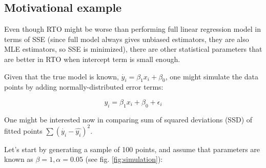 \documentclass[12pt,a4paper,oneside]{book} %
\begin{document}
	\subsection{Motivational example}

Even though RTO might be worse than performing full linear regression model in terms of SSE (since full model always gives unbiased estimators, they are also MLE estimators, so SSE is minimized), there are other statistical parameters that are better in RTO when intercept term is small enough.

Given that the true model is known, $\dot{y_i} = \beta_1 x_i + \beta_0$, one might simulate the data points by adding normally-distributed error terms:

\[
	y_i =  \beta_1 x_i + \beta_0 + \epsilon_i
\]

One might be interested now in comparing sum of squared deviations (SSD) of fitted points $\sum (\dot{y_i}-\hat{y_i})^2 $.

Let's start by generating a sample of 100 points, and assume that parameters are known as $\beta = 1, \alpha = 0.05$ (see fig. \ref{fig:simulation}):
\end{document}
